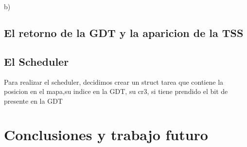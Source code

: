 \documentclass[a4paper]{article}
\newenvironment{codesnippet}{%
	\begin{Sbox}\begin{minipage}{\textwidth}\sffamily\small}%
	{\end{minipage}\end{Sbox}%
		\begin{center}%
		\vspace{-0.4cm}\colorbox{litegrey}{\TheSbox}\end{center}\vspace{0.3cm}}
\begin{document}
b) 

\subsection{El retorno de la GDT y la aparicion de la TSS}

\subsection{El Scheduler}
Para realizar el scheduler, decidimos crear un struct tarea que contiene la posicion en el mapa,su indice en la GDT, su cr3, si tiene prendido el bit de presente en la GDT

\section{Conclusiones y trabajo futuro}






\end{document}
